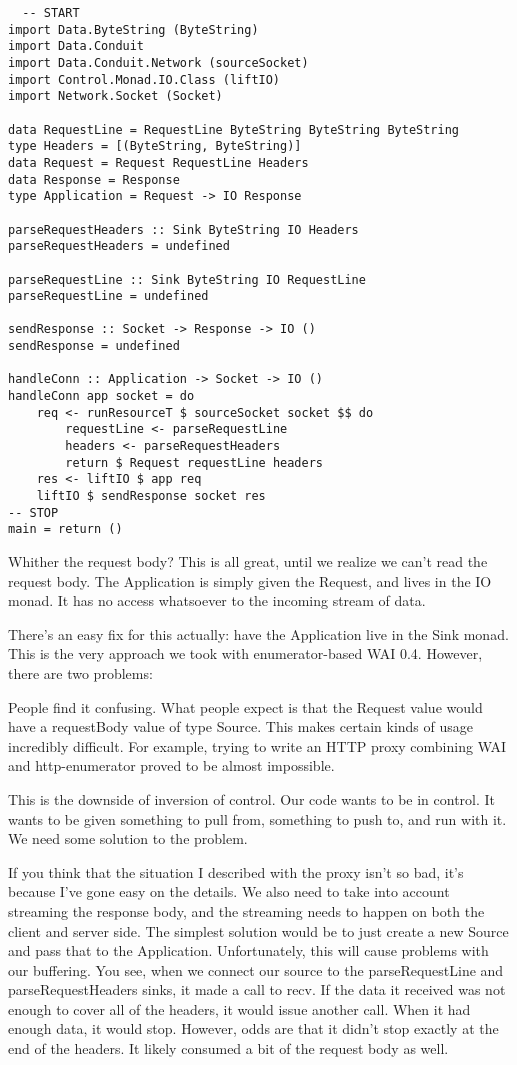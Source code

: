 \begin{lstlisting}
  -- START
import Data.ByteString (ByteString)
import Data.Conduit
import Data.Conduit.Network (sourceSocket)
import Control.Monad.IO.Class (liftIO)
import Network.Socket (Socket)

data RequestLine = RequestLine ByteString ByteString ByteString
type Headers = [(ByteString, ByteString)]
data Request = Request RequestLine Headers
data Response = Response
type Application = Request -> IO Response

parseRequestHeaders :: Sink ByteString IO Headers
parseRequestHeaders = undefined

parseRequestLine :: Sink ByteString IO RequestLine
parseRequestLine = undefined

sendResponse :: Socket -> Response -> IO ()
sendResponse = undefined

handleConn :: Application -> Socket -> IO ()
handleConn app socket = do
    req <- runResourceT $ sourceSocket socket $$ do
        requestLine <- parseRequestLine
        headers <- parseRequestHeaders
        return $ Request requestLine headers
    res <- liftIO $ app req
    liftIO $ sendResponse socket res
-- STOP
main = return ()
\end{lstlisting}
Whither the request body?
This is all great, until we realize we can't read the request body. The
Application is simply given the Request, and lives in the
IO monad. It has no access whatsoever to the incoming stream of data.

There's an easy fix for this actually: have the Application live in the
Sink monad. This is the very approach we took with
enumerator-based WAI 0.4. However, there are two problems:


People find it confusing. What people expect is that the Request
value would have a requestBody value of type Source.
This makes certain kinds of usage incredibly difficult. For example, trying to write an
HTTP
proxy combining WAI and http-enumerator proved to be almost impossible.

This is the downside of inversion of control. Our code wants to be in control. It wants to
be
given something to pull from, something to push to, and run with it. We need some solution
to the
problem.

If you think that the situation I described with the proxy isn't so bad, it's because I've
gone easy on the details. We also need to take into account streaming the response body,
and the
streaming needs to happen on both the client and server side.
The simplest solution would be to just create a new Source and pass that to
the Application. Unfortunately, this will cause problems with our buffering. You
see, when we connect our source to the parseRequestLine and
parseRequestHeaders sinks, it made a call to recv. If the data
it received was not enough to cover all of the headers, it would issue another call. When
it had
enough data, it would stop. However, odds are that it didn't stop exactly at the end of
the headers. It likely consumed a bit of the request body as well.

